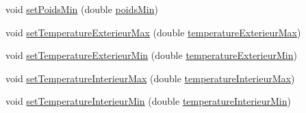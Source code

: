 \begin{DoxyCompactItemize}
\item 
void \hyperlink{classcom_1_1example_1_1bee__honeyt_1_1_ruche_aace243242d173adf82592342fecc1328}{set\+Poids\+Min} (double \hyperlink{classcom_1_1example_1_1bee__honeyt_1_1_ruche_a3408f099f2fab8700353e6e266fe8221}{poids\+Min})
\item 
void \hyperlink{classcom_1_1example_1_1bee__honeyt_1_1_ruche_a041d831cfbd058ba27d1b6901b046391}{set\+Temperature\+Exterieur\+Max} (double \hyperlink{classcom_1_1example_1_1bee__honeyt_1_1_ruche_afd45ecd796457b633615488195153114}{temperature\+Exterieur\+Max})
\item 
void \hyperlink{classcom_1_1example_1_1bee__honeyt_1_1_ruche_ab93955d5269feca538027be06711413a}{set\+Temperature\+Exterieur\+Min} (double \hyperlink{classcom_1_1example_1_1bee__honeyt_1_1_ruche_a6e88eae7cc58b7c7ca3846d789fe1c2b}{temperature\+Exterieur\+Min})
\item 
void \hyperlink{classcom_1_1example_1_1bee__honeyt_1_1_ruche_ad0c1bb53162040918c8a9f2ed7c37dd0}{set\+Temperature\+Interieur\+Max} (double \hyperlink{classcom_1_1example_1_1bee__honeyt_1_1_ruche_af2d8d214dabc9af08329aa3173047245}{temperature\+Interieur\+Max})
\item 
void \hyperlink{classcom_1_1example_1_1bee__honeyt_1_1_ruche_abd355743c57f79e2bf544bd20559b33f}{set\+Temperature\+Interieur\+Min} (double \hyperlink{classcom_1_1example_1_1bee__honeyt_1_1_ruche_a143b0b293ab3aaa67a86550efeb56f07}{temperature\+Interieur\+Min})
\end{DoxyCompactItemize}
